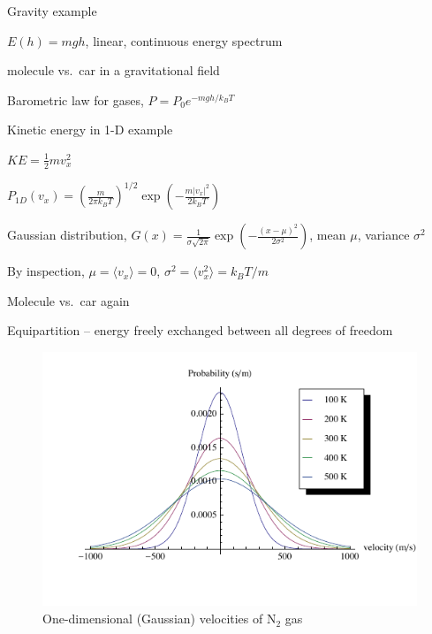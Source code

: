 \message{ !name(Outline.tex)}\documentclass[11pt]{article}
\begin{document}
\begin{outline}
\begin{outline}
\begin{outline}
   \item{Gravity example}
      \begin{outline}
      \item $E(h)=mgh$, linear, continuous energy spectrum
      \item{molecule vs.\ car in a gravitational field}
      \item{Barometric law for gases, $P=P_0e^{-mgh/k_BT}$}
      \end{outline}
    \item {Kinetic energy in 1-D example}
      \begin{outline}
      \item $KE = \frac{1}{2}m v_x^2$
      \item $P_{1D}(v_x) = \left ( \frac{m}{2\pi k_B T} \right )^{1/2}\exp\left
          (-\frac{m|v_x|^2}{2 k_BT} \right )$
      \item Gaussian distribution,
        $G(x)=\frac{1}{\sigma\sqrt{2\pi}} \exp\left (
          -\frac{(x-\mu)^2}{2\sigma^2} \right )$, mean $\mu$, variance $\sigma^2$
      \item By inspection, $\mu=\langle v_x \rangle=0$, $\sigma^2=\langle v_x^2\rangle =k_BT/m$
      \item Molecule vs.\ car again
      \end{outline}
    \item Equipartition -- energy freely exchanged between all degrees
      of freedom
    \end{outline}
  \end{outline}

\begin{figure}
\begin{center}
\includegraphics[scale=1.25]{Images/Gaussian.pdf}
\caption{One-dimensional (Gaussian) velocities of N$_2$ gas}
\end{center}
\end{figure}


\end{outline}
\end{document}

